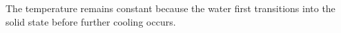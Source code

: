 The temperature remains constant because the water first transitions into the solid state before further cooling occurs.